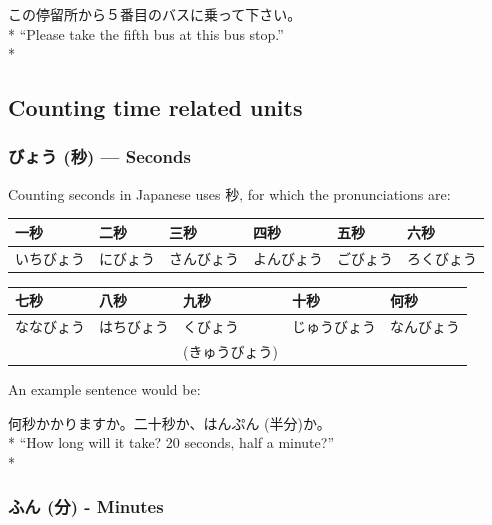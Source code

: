 \documentclass[11pt, b5paper, twoside, openright, onecolumn]{book}
\makeatletter
\newcommand*{\rubystack}[2]{{\relscale{0.5}%
  \begin{tabular}[b]{@{}c@{}}%
    {#1}\\%
   {\textscale{2}{#2}}%
  \end{tabular}}%
}
\DeclareRobustCommand*{\ruby}[2]{%
  \mbox{%
    \setlength{\parskip}{0ex}%
    \BeginAccSupp{method=pdfstringdef,ActualText={#1}}%
      \rubystack{\phantom{#2}}{#1}%
      \llap{%
        \rubystack{#2}{\phantom{#1}}%
      }%
    \EndAccSupp{}%
  }%
}
\renewcommand*{\ruby}[2]{#2 (#1)}%
\newenvironment{exampleblock}{
\setlength{\parindent}{0.6in}
\begin{minipage}[t]{\dimexpr\textwidth-\parindent}}
{\end{minipage}}
\newenvironment{mytabular}[1]{\noindent\hspace{0.4in}
\begin{tabular}[h]{#1}}{\end{tabular}}
\makeatother
\begin{document}
\begin{exampleblock}
この停留所から５番目のバスに乗って下さい。 \\* 
“Please take the fifth bus at this bus stop.” \\* 
\end{exampleblock}
\subsection{Counting time related units}


\subsubsection{\ruby{秒}{びょう} — Seconds}

Counting seconds in Japanese uses 秒‚ for which the pronunciations are:

\vspace{0.5cm}
\smaller
\begin{mytabular}{| l  l  l  l  l  l |}\hline 
\rule{0pt}{2.4ex}一秒 & 二秒 & 三秒 & 四秒 & 五秒 & 六秒\\ 
\hline
\rule{0pt}{2.4ex}いちびょう & にびょう & さんびょう & よんびょう & ごびょう & ろくびょう\\ 
\hline 
\end{mytabular}
\larger
\vspace{0.5cm}

\smaller
\begin{mytabular}{| l  l  l  l  l |}\hline 
\rule{0pt}{2.4ex}七秒 & 八秒 & 九秒 & 十秒 & 何秒\\ 
\hline
\rule{0pt}{2.4ex}ななびょう & はちびょう & くびょう & じゅうびょう & なんびょう\\ 
\rule{0pt}{2.4ex} &  & (きゅうびょう) &  & \\ 
\hline 
\end{mytabular}
\larger
\vspace{0.5cm}


An example sentence would be:

\vspace{0.4cm}
\begin{exampleblock}
何秒かかりますか。二十秒か、\ruby{半分}{はんぷん}か。 \\* 
“How long will it take? 20 seconds‚ half a minute?” \\* 
\end{exampleblock}
\subsubsection{\ruby{分}{ふん} - Minutes}
\end{document}
